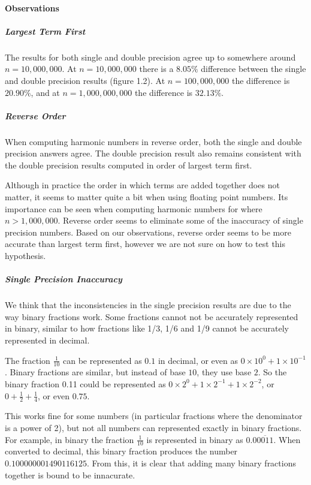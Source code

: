 \documentclass[12pt]{article}
\begin{document}
\paragraph{Observations}
\subparagraph{Largest Term First}
The results for both single and double precision agree up to somewhere around $n=10,000,000$. At $n=10,000,000$ there is a $8.05\%$ difference between the single and double precision results (figure 1.2). At $n=100,000,000$ the difference is $20.90\%$, and at $n=1,000,000,000$ the difference is $32.13\%$.

\subparagraph{Reverse Order}
When computing harmonic numbers in reverse order, both the single and double precision answers agree. The double precision result also remains consistent with the double precision results computed in order of largest term first.

Although in practice the order in which terms are added together does not matter, it seems to matter quite a bit when using floating point numbers. Its importance can be seen when computing harmonic numbers for where $n>1,000,000$. Reverse order seems to eliminate some of the inaccuracy of single precision numbers. Based on our observations, reverse order seems to be more accurate than largest term first, however we are not sure on how to test this hypothesis.

\subparagraph{Single Precision Inaccuracy}
We think that the inconsistencies in the single precision results are due to the way binary fractions work. Some fractions cannot not be accurately represented in binary, similar to how fractions like 1/3, 1/6 and 1/9 cannot be accurately represented in decimal. 

The fraction $\frac{1}{10}$ can be represented as $0.1$ in decimal, or even as $0 \times 10^{0} + 1 \times 10^{-1}$. Binary fractions are similar, but instead of base $10$, they use base $2$. So the binary fraction 0.11 could be represented as $0 \times 2^{0} + 1 \times 2^{-1} + 1 \times 2^{-2} $, or $0 + \frac{1}{2} + \frac{1}{4}$, or even $0.75$. 

This works fine for some numbers (in particular fractions where the denominator is a power of 2), but not all numbers can represented exactly in binary fractions. For example, in binary the fraction $\frac{1}{10}$ is represented in binary as $0.0\overline{0011}$. When converted to decimal, this binary fraction produces the number $0.100000001490116125$. From this, it is clear that adding many binary fractions together is bound to be innacurate.
\end{document}
